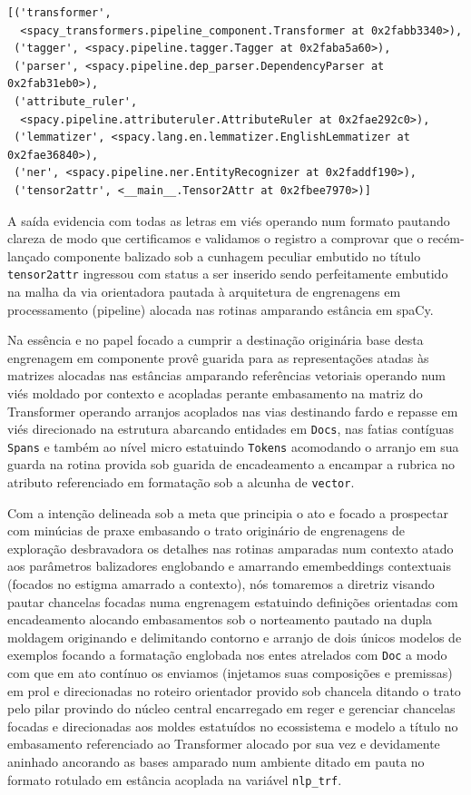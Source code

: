 \documentclass[
  brazilian,
]{article}
\begin{document}
\begin{verbatim}
[('transformer',
  <spacy_transformers.pipeline_component.Transformer at 0x2fabb3340>),
 ('tagger', <spacy.pipeline.tagger.Tagger at 0x2faba5a60>),
 ('parser', <spacy.pipeline.dep_parser.DependencyParser at 0x2fab31eb0>),
 ('attribute_ruler',
  <spacy.pipeline.attributeruler.AttributeRuler at 0x2fae292c0>),
 ('lemmatizer', <spacy.lang.en.lemmatizer.EnglishLemmatizer at 0x2fae36840>),
 ('ner', <spacy.pipeline.ner.EntityRecognizer at 0x2faddf190>),
 ('tensor2attr', <__main__.Tensor2Attr at 0x2fbee7970>)]
\end{verbatim}

A saída evidencia com todas as letras em viés operando num formato
pautando clareza de modo que certificamos e validamos o registro a
comprovar que o recém-lançado componente balizado sob a cunhagem
peculiar embutido no título \texttt{tensor2attr} ingressou com status a
ser inserido sendo perfeitamente embutido na malha da via orientadora
pautada à arquitetura de engrenagens em processamento (pipeline) alocada
nas rotinas amparando estância em spaCy.

Na essência e no papel focado a cumprir a destinação originária base
desta engrenagem em componente provê guarida para as representações
atadas às matrizes alocadas nas estâncias amparando referências
vetoriais operando num viés moldado por contexto e acopladas perante
embasamento na matriz do Transformer operando arranjos acoplados nas
vias destinando fardo e repasse em viés direcionado na estrutura
abarcando entidades em \texttt{Docs}, nas fatias contíguas
\texttt{Spans} e também ao nível micro estatuindo \texttt{Tokens}
acomodando o arranjo em sua guarda na rotina provida sob guarida de
encadeamento a encampar a rubrica no atributo referenciado em formatação
sob a alcunha de \texttt{vector}.

Com a intenção delineada sob a meta que principia o ato e focado a
prospectar com minúcias de praxe embasando o trato originário de
engrenagens de exploração desbravadora os detalhes nas rotinas amparadas
num contexto atado aos parâmetros balizadores englobando e amarrando
emembeddings contextuais (focados no estigma amarrado a contexto), nós
tomaremos a diretriz visando pautar chancelas focadas numa engrenagem
estatuindo definições orientadas com encadeamento alocando embasamentos
sob o norteamento pautado na dupla moldagem originando e delimitando
contorno e arranjo de dois únicos modelos de exemplos focando a
formatação englobada nos entes atrelados com \texttt{Doc} a modo com que
em ato contínuo os enviamos (injetamos suas composições e premissas) em
prol e direcionadas no roteiro orientador provido sob chancela ditando o
trato pelo pilar provindo do núcleo central encarregado em reger e
gerenciar chancelas focadas e direcionadas aos moldes estatuídos no
ecossistema e modelo a título no embasamento referenciado ao Transformer
alocado por sua vez e devidamente aninhado ancorando as bases amparado
num ambiente ditado em pauta no formato rotulado em estância acoplada na
variável \texttt{nlp\_trf}.
\end{document}
